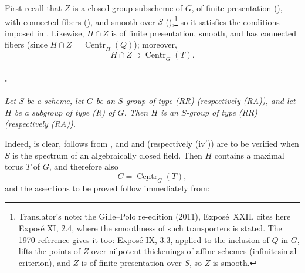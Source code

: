First recall that \(Z\) is a closed group subscheme of \(G\), of
finite presentation (), with connected fibers
(), and smooth over \(S\) (),\footnote{Translator's note: the Gille--Polo re-edition (2011), Exposé~XXII,
cites here Exposé XI, 2.4, where the smoothness of such transporters is stated.
The 1970 reference gives it too: Exposé IX, 3.3, applied to the inclusion of
\(Q\) in \(G\), lifts the points of \(Z\) over nilpotent thickenings of affine
schemes (infinitesimal criterion), and \(Z\) is of finite presentation over
\(S\), so \(Z\) is smooth.} so it
satisfies the conditions imposed in . Likewise,
\(H\cap Z\) is of finite presentation, smooth, and has connected
fibers (since
\(H\cap Z=\underline{\operatorname{Centr}}_H(Q)\)); moreover,
\[
  H\cap Z\supset\underline{\operatorname{Centr}}_G(T).
\]

\paragraph{.}
\textit{Let \(S\) be a scheme, let \(G\) be an \(S\)-group of type
\textup{(RR)} \textup{(respectively \textup{(RA)})}, and let \(H\)
be a subgroup of type \textup{(R)} of \(G\). Then \(H\) is an
\(S\)-group of type \textup{(RR)} \textup{(respectively
\textup{(RA)})}.}

Indeed, \textup{} is clear, \textup{} follows from 
\textup{}, and \textup{} and \textup{}
\textup{(respectively \textup{(iv$'$)})} are to be verified when
\(S\) is the spectrum of an algebraically closed field. Then \(H\)
contains a maximal torus \(T\) of \(G\), and therefore also
\[
  C=\underline{\operatorname{Centr}}_G(T),
\]
and the assertions to be proved follow immediately from:

